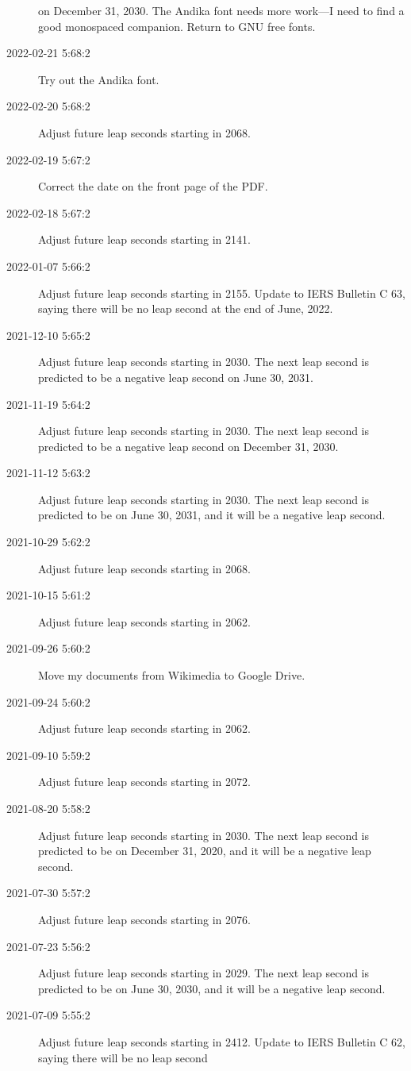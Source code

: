 \documentclass[letterpaper,twoside]{article}
\begin{document}
\begin{description}
  on December 31, 2030.  The Andika font needs more work---I need to
  find a good monospaced companion.  Return to GNU free fonts.
\item[2022-02-21 5:68:2]Try out the Andika font.
\item[2022-02-20 5:68:2]Adjust future leap seconds starting in 2068.
\item[2022-02-19 5:67:2]Correct the date on the front page of the PDF.
\item[2022-02-18 5:67:2]Adjust future leap seconds starting in 2141.
\item[2022-01-07 5:66:2]Adjust future leap seconds starting in 2155.
  Update to IERS Bulletin C 63, saying there will be no leap second
  at the end of June, 2022.
\item[2021-12-10 5:65:2]Adjust future leap seconds starting in 2030.
  The next leap second is predicted to be a negative leap second
  on June 30, 2031.
\item[2021-11-19 5:64:2]Adjust future leap seconds starting in 2030.
  The next leap second is predicted to be a negative leap second
  on December 31, 2030.
\item[2021-11-12 5:63:2]Adjust future leap seconds starting in 2030.
  The next leap second is predicted to be on June 30, 2031, and it
  will be a negative leap second.
\item[2021-10-29 5:62:2]Adjust future leap seconds starting in 2068.
\item[2021-10-15 5:61:2]Adjust future leap seconds starting in 2062.
\item[2021-09-26 5:60:2]Move my documents from Wikimedia to Google Drive.
\item[2021-09-24 5:60:2]Adjust future leap seconds starting in 2062.
\item[2021-09-10 5:59:2]Adjust future leap seconds starting in 2072.
\item[2021-08-20 5:58:2]Adjust future leap seconds starting in 2030.
  The next leap second is predicted to be on December 31, 2020, and it
  will be a negative leap second.
\item[2021-07-30 5:57:2]Adjust future leap seconds starting in 2076.
\item[2021-07-23 5:56:2]Adjust future leap seconds starting in 2029.
  The next leap second is predicted to be on June 30, 2030, and it
  will be a negative leap second.
\item[2021-07-09 5:55:2]Adjust future leap seconds starting in 2412.
  Update to IERS Bulletin C 62, saying there will be no leap second

\end{description}
\end{document}
